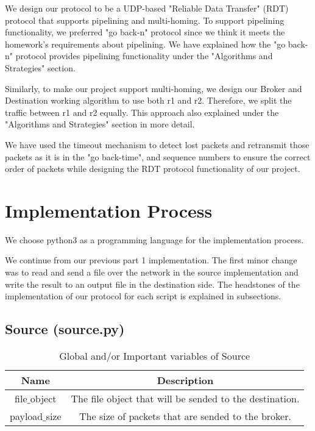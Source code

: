 \documentclass[conference]{IEEEtran}
\begin{document}
We design our protocol to be a UDP-based "Reliable Data Transfer" (RDT) protocol that supports pipelining and multi-homing. To support pipelining functionality, we preferred  "go back-n" protocol since we think it meets the homework's requirements about pipelining. We have explained how the "go back-n" protocol provides pipelining functionality under the "Algorithms and Strategies" section.

Similarly, to make our project support multi-homing, we design our Broker and Destination working algorithm to use both r1 and r2. Therefore, we split the traffic between r1 and r2 equally. This approach also explained under the "Algorithms and Strategies" section in more detail.

We have used the timeout mechanism to detect lost packets and retransmit those packets as it is in the "go back-time", and sequence numbers to ensure the correct order of packets while designing the RDT protocol functionality of our project. 

\section{Implementation Process}
We choose python3 as a programming language for the implementation process.

We continue from our previous part 1 implementation. The first minor change was to read and send a file over the network in the source implementation and write the result to an output file in the destination side. The headstones of the implementation of our protocol for each script is explained in subsections.

\subsection{Source (source.py)}

\begin{table}[h]
\renewcommand{\arraystretch}{1.3}
\caption{Global and/or Important variables of Source}
\label{tab:example}
\centering
\begin{tabular}{c|c}
    \hline
    Name &  Description\\
    \hline
    \hline

    file$\_$object   &   The file object that will be sended to the destination.\\
    \hline

    payload$\_$size    &   The size of packets that are sended to the broker.\\
    \hline
\end{tabular}
\end{table}
\end{document}
